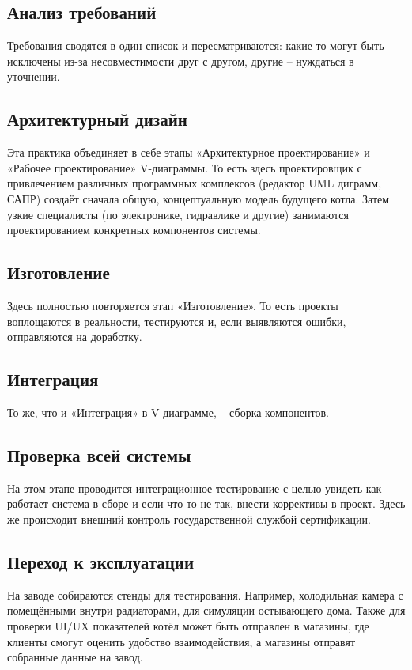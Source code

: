 \documentclass[bibliography=totocnumbered]{scrartcl}
\begin{document}
\subsection{Анализ требований}
Требования сводятся в один список и пересматриваются: какие-то могут быть исключены из-за несовместимости друг с другом, другие -- нуждаться в уточнении.

\subsection{Архитектурный дизайн}
Эта практика объединяет в себе этапы «Архитектурное проектирование» и «Рабочее проектирование» V-диаграммы. То есть здесь проектировщик с привлечением различных программных комплексов (редактор UML диграмм, САПР) создаёт сначала общую, концептуальную модель будущего котла. Затем узкие специалисты (по электронике, гидравлике и другие) занимаются проектированием конкретных компонентов системы.

\subsection{Изготовление}
Здесь полностью повторяется этап «Изготовление». То есть проекты воплощаются в реальности, тестируются и, если выявляются ошибки, отправляются на доработку.

\subsection{Интеграция}
То же, что и «Интеграция» в V-диаграмме, -- сборка компонентов.

\subsection{Проверка всей системы}
На этом этапе проводится интеграционное тестирование с целью увидеть как работает система в сборе и если что-то не так, внести коррективы в проект. Здесь же происходит внешний контроль государственной службой сертификации.

\subsection{Переход к эксплуатации}
На заводе собираются стенды для тестирования. Например, холодильная камера с помещёнными внутри радиаторами, для симуляции остывающего дома. Также для проверки UI/UX показателей котёл может быть отправлен в магазины, где клиенты смогут оценить удобство взаимодействия, а магазины отправят собранные данные на завод.
\end{document}
